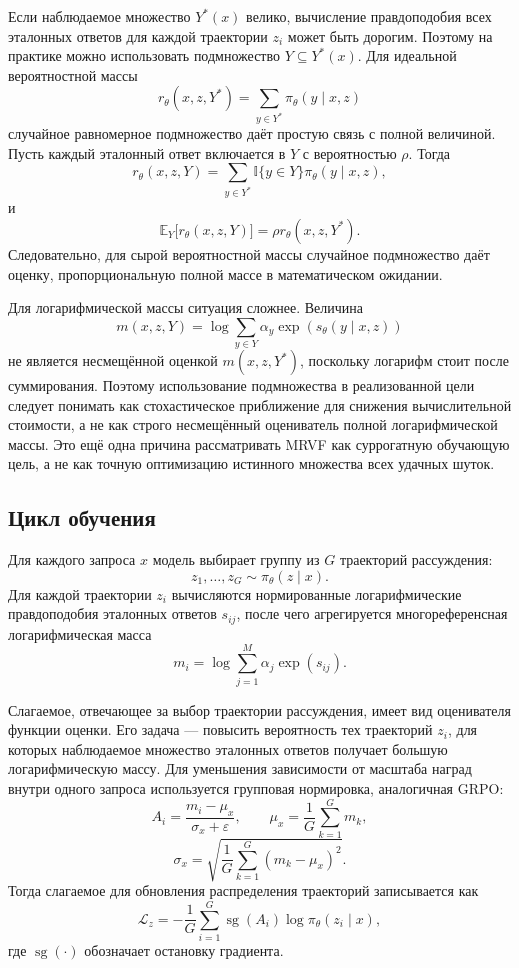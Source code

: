 Если наблюдаемое множество \(Y^{*}(x)\) велико, вычисление правдоподобия всех эталонных ответов для каждой траектории \(z_i\) может быть дорогим. Поэтому на практике можно использовать подмножество \(Y\subseteq Y^{*}(x)\). Для идеальной вероятностной массы
\[
    r_{\theta}(x,z,Y^{*})
    =
    \sum_{y\in Y^{*}}
    \pi_{\theta}(y\mid x,z)
\]
случайное равномерное подмножество даёт простую связь с полной величиной. Пусть каждый эталонный ответ включается в \(Y\) с вероятностью \(\rho\). Тогда
\[
    r_{\theta}(x,z,Y)
    =
    \sum_{y\in Y^{*}}
    \mathbb{I}\{y\in Y\}
    \pi_{\theta}(y\mid x,z),
\]
и
\[
    \mathbb{E}_{Y}
    \big[
        r_{\theta}(x,z,Y)
        \big]
    =
    \rho
    r_{\theta}(x,z,Y^{*}).
\]
Следовательно, для сырой вероятностной массы случайное подмножество даёт оценку, пропорциональную полной массе в математическом ожидании.

Для логарифмической массы ситуация сложнее. Величина
\[
    m(x,z,Y)
    =
    \log
    \sum_{y\in Y}
    \alpha_y
    \exp(s_{\theta}(y\mid x,z))
\]
не является несмещённой оценкой \(m(x,z,Y^{*})\), поскольку логарифм стоит после суммирования. Поэтому использование подмножества в реализованной цели следует понимать как стохастическое приближение для снижения вычислительной стоимости, а не как строго несмещённый оцениватель полной логарифмической массы. Это ещё одна причина рассматривать MRVF как суррогатную обучающую цель, а не как точную оптимизацию истинного множества всех удачных шуток.

\subsection{Цикл обучения}

Для каждого запроса \(x\) модель выбирает группу из \(G\) траекторий рассуждения:
\[
    z_1,\ldots,z_G
    \sim
    \pi_{\theta}(z\mid x).
\]
Для каждой траектории \(z_i\) вычисляются нормированные логарифмические правдоподобия эталонных ответов \(s_{ij}\), после чего агрегируется многореференсная логарифмическая масса
\[
    m_i
    =
    \log
    \sum_{j=1}^{M}
    \alpha_j
    \exp(s_{ij}).
\]

Слагаемое, отвечающее за выбор траектории рассуждения, имеет вид оценивателя функции оценки. Его задача --- повысить вероятность тех траекторий \(z_i\), для которых наблюдаемое множество эталонных ответов получает большую логарифмическую массу. Для уменьшения зависимости от масштаба наград внутри одного запроса используется групповая нормировка, аналогичная GRPO:
\[
    A_i
    =
    \frac{m_i-\mu_x}{\sigma_x+\varepsilon},
    \qquad
    \mu_x=
    \frac{1}{G}
    \sum_{k=1}^{G}
    m_k,
\]
\[
    \sigma_x
    =
    \sqrt{
        \frac{1}{G}
        \sum_{k=1}^{G}
        (m_k-\mu_x)^2
    }.
\]
Тогда слагаемое для обновления распределения траекторий записывается как
\[
    \mathcal{L}_{z}
    =
    -
    \frac{1}{G}
    \sum_{i=1}^{G}
    \operatorname{sg}(A_i)
    \log
    \pi_{\theta}(z_i\mid x),
\]
где \(\operatorname{sg}(\cdot)\) обозначает остановку градиента.

